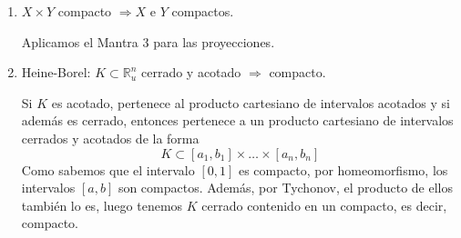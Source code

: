 \begin{obs}
\begin{enumerate}
    \item $X \times Y$ compacto $\Rightarrow X$ e $Y$ compactos.\begin{demo}
        Aplicamos el Mantra $3$ para las proyecciones.
    \end{demo} 
    \item Heine-Borel: $K \subset \mathbb{R}_u^n$ cerrado y acotado $\Rightarrow$ compacto.
    \begin{demo}
    Si $K$ es acotado, pertenece al producto cartesiano de intervalos acotados y si además es cerrado, entonces pertenece a un producto cartesiano de intervalos cerrados y acotados de la forma
    \[
	K \subset \left[ a_1, b_1 \right] \times \ldots \times \left[ a_n, b_n \right]
    \]
    Como sabemos que el intervalo $[0,1]$ es compacto, por homeomorfismo, los intervalos $[a,b]$ son compactos. Además, por Tychonov, el producto de ellos también lo es, luego tenemos $K$ cerrado contenido en un compacto, es decir, compacto.
    \end{demo}
\end{enumerate}
\end{obs}



